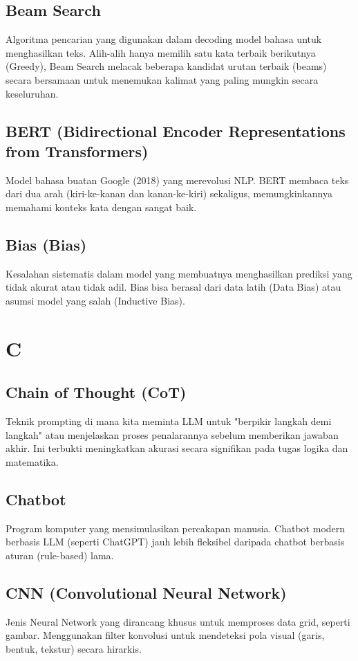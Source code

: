 \subsection*{Beam Search}
Algoritma pencarian yang digunakan dalam decoding model bahasa untuk menghasilkan teks. Alih-alih hanya memilih satu kata terbaik berikutnya (Greedy), Beam Search melacak beberapa kandidat urutan terbaik (beams) secara bersamaan untuk menemukan kalimat yang paling mungkin secara keseluruhan.

\subsection*{BERT (Bidirectional Encoder Representations from Transformers)}
Model bahasa buatan Google (2018) yang merevolusi NLP. BERT membaca teks dari dua arah (kiri-ke-kanan dan kanan-ke-kiri) sekaligus, memungkinkannya memahami konteks kata dengan sangat baik.

\subsection*{Bias (Bias)}
Kesalahan sistematis dalam model yang membuatnya menghasilkan prediksi yang tidak akurat atau tidak adil. Bias bisa berasal dari data latih (Data Bias) atau asumsi model yang salah (Inductive Bias).

\section*{C}

\subsection*{Chain of Thought (CoT)}
Teknik prompting di mana kita meminta LLM untuk "berpikir langkah demi langkah" atau menjelaskan proses penalarannya sebelum memberikan jawaban akhir. Ini terbukti meningkatkan akurasi secara signifikan pada tugas logika dan matematika.

\subsection*{Chatbot}
Program komputer yang mensimulasikan percakapan manusia. Chatbot modern berbasis LLM (seperti ChatGPT) jauh lebih fleksibel daripada chatbot berbasis aturan (rule-based) lama.

\subsection*{CNN (Convolutional Neural Network)}
Jenis Neural Network yang dirancang khusus untuk memproses data grid, seperti gambar. Menggunakan filter konvolusi untuk mendeteksi pola visual (garis, bentuk, tekstur) secara hirarkis.

